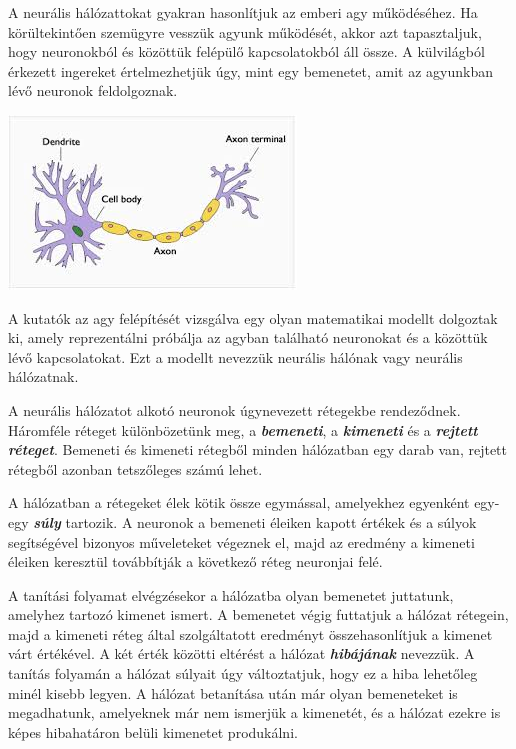 
A neurális hálózattokat gyakran hasonlítjuk az emberi agy működéséhez. Ha körültekintően szemügyre vesszük agyunk működését, akkor azt tapasztaljuk, hogy neuronokból és közöttük felépülő kapcsolatokból áll össze. A külvilágból érkezett ingereket értelmezhetjük úgy, mint egy bemenetet, amit az agyunkban lévő neuronok feldolgoznak.

\begin{center}
	\includegraphics[scale=1.0]{images/neuron.png}
\end{center}

A kutatók az agy felépítését vizsgálva egy olyan matematikai modellt dolgoztak ki, amely   reprezentálni próbálja az agyban található neuronokat és a közöttük lévő kapcsolatokat. Ezt a modellt nevezzük neurális hálónak vagy neurális hálózatnak.

A neurális hálózatot alkotó neuronok úgynevezett rétegekbe rendeződnek. Háromféle réteget különbözetünk meg, a \textbf{\textit{bemeneti}}, a \textbf{\textit{kimeneti}} és a \textbf{\textit{rejtett réteget}}. Bemeneti és kimeneti rétegből minden hálózatban egy darab van, rejtett rétegből azonban tetszőleges számú lehet.

A hálózatban a rétegeket élek kötik össze egymással, amelyekhez egyenként egy-egy \textbf{\textit{súly}} tartozik. A neuronok a bemeneti éleiken kapott értékek és a súlyok segítségével bizonyos műveleteket végeznek el, majd az eredmény a kimeneti éleiken keresztül továbbítják a következő réteg neuronjai felé.

A tanítási folyamat elvégzésekor a hálózatba olyan bemenetet juttatunk, amelyhez tartozó kimenet ismert. A bemenetet végig futtatjuk a hálózat rétegein, majd a kimeneti réteg által szolgáltatott eredményt összehasonlítjuk a kimenet várt értékével. A két érték közötti eltérést a hálózat \textit{\textbf{hibájának}} nevezzük. A tanítás folyamán a hálózat súlyait úgy változtatjuk, hogy ez a hiba lehetőleg minél kisebb legyen. A hálózat betanítása után már olyan bemeneteket is megadhatunk, amelyeknek már nem ismerjük a kimenetét, és a hálózat ezekre is képes hibahatáron belüli kimenetet produkálni.

